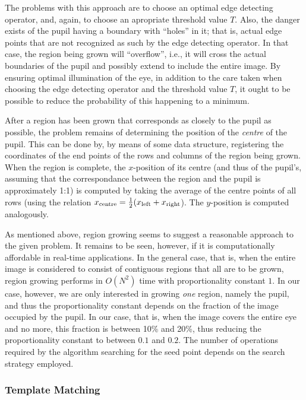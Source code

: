 The problems with this approach are to choose an optimal edge
detecting operator, and, again, to choose an apropriate threshold
value $T$.  Also, the danger exists of the pupil having a boundary
with ``holes'' in it; that is, actual edge points that are not
recognized as such by the edge detecting operator.  In that case, the
region being grown will ``overflow'', i.e., it will cross the actual
boundaries of the pupil and possibly extend to include the entire
image.  By ensuring optimal illumination of the eye, in addition to
the care taken when choosing the edge detecting operator and the
threshold value $T$, it ought to be possible to reduce the probability
of this happening to a minimum.

After a region has been grown that corresponds as closely to the pupil
as possible, the problem remains of determining the position of the
{\em centre\/} of the pupil.  This can be done by, by means of some
data structure, registering the coordinates of the end points of the
rows and columns of the region being grown.  When the region is
complete, the $x$-position of its centre (and thus of the pupil's,
assuming that the correspondance between the region and the pupil is
approximately 1:1) is computed by taking the average of the centre
points of all rows (using the relation $x_{\mbox{\scriptsize
    centre}}=\frac{1}{2} (x_{\mbox{\scriptsize
    left}}+x_{\mbox{\scriptsize right}}$).  The $y$-position is
computed analogously.

As mentioned above, region growing seems to suggest a reasonable
approach to the given problem.  It remains to be seen, however, if it
is computationally affordable in real-time applications.  In the
general case, that is, when the entire image is considered to consist
of contiguous regions that all are to be grown, region growing
performs in $O(N^{2})$ time with proportionality constant $1$.  In our
case, however, we are only interested in growing {\em one\/} region,
namely the pupil, and thus the proportionality constant depends on the
fraction of the image occupied by the pupil.  In our case, that is,
when the image covers the entire eye and no more, this fraction is
between 10\% and 20\%, thus reducing the proportionality constant to
between $0.1$ and $0.2$.  The number of operations required by the
algorithm searching for the seed point depends on the search strategy
employed.

\subsubsection{Template Matching}

